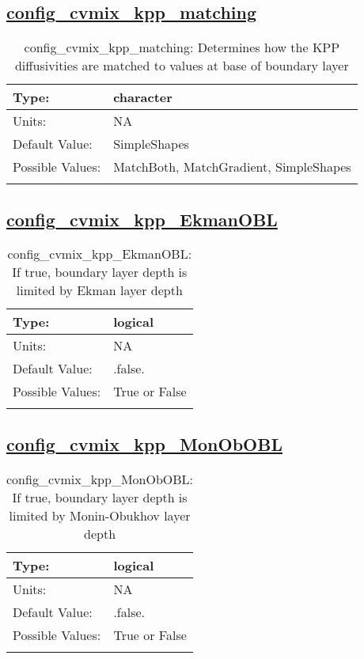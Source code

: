 \subsection[config\_cvmix\_kpp\_matching]{\hyperref[sec:nm_tab_cvmix]{config\_cvmix\_kpp\_matching}}
\label{subsec:nm_sec_config_cvmix_kpp_matching}
\begin{center}
\begin{longtable}{| p{2.0in} || p{4.0in} |}
    \hline
    Type: & character \\
    \hline
    Units: & \si{NA} \\
    \hline
    Default Value: & SimpleShapes \\
    \hline
    Possible Values: & MatchBoth, MatchGradient, SimpleShapes \\
    \hline
    \caption{config\_cvmix\_kpp\_matching: Determines how the KPP diffusivities are matched to values at base of boundary layer}
\end{longtable}
\end{center}
\subsection[config\_cvmix\_kpp\_EkmanOBL]{\hyperref[sec:nm_tab_cvmix]{config\_cvmix\_kpp\_EkmanOBL}}
\label{subsec:nm_sec_config_cvmix_kpp_EkmanOBL}
\begin{center}
\begin{longtable}{| p{2.0in} || p{4.0in} |}
    \hline
    Type: & logical \\
    \hline
    Units: & \si{NA} \\
    \hline
    Default Value: & .false. \\
    \hline
    Possible Values: & True or False \\
    \hline
    \caption{config\_cvmix\_kpp\_EkmanOBL: If true, boundary layer depth is limited by Ekman layer depth}
\end{longtable}
\end{center}
\subsection[config\_cvmix\_kpp\_MonObOBL]{\hyperref[sec:nm_tab_cvmix]{config\_cvmix\_kpp\_MonObOBL}}
\label{subsec:nm_sec_config_cvmix_kpp_MonObOBL}
\begin{center}
\begin{longtable}{| p{2.0in} || p{4.0in} |}
    \hline
    Type: & logical \\
    \hline
    Units: & \si{NA} \\
    \hline
    Default Value: & .false. \\
    \hline
    Possible Values: & True or False \\
    \hline
    \caption{config\_cvmix\_kpp\_MonObOBL: If true, boundary layer depth is limited by Monin-Obukhov layer depth}
\end{longtable}
\end{center}

